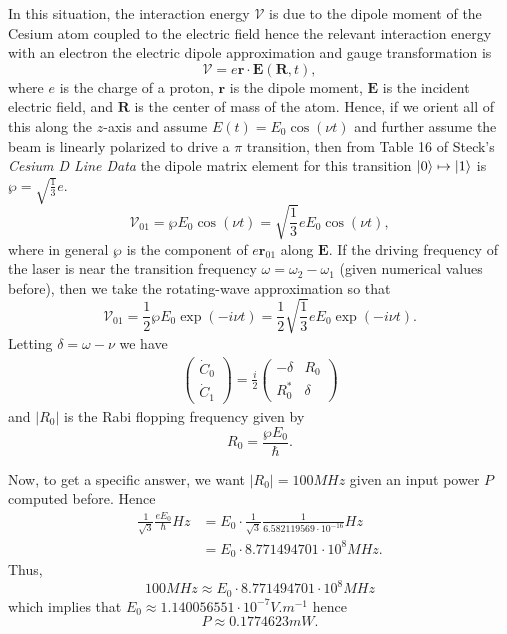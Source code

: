 \documentclass[12pt]{article} %
\begin{document}
\begin{solution}
In this situation, the interaction energy $\mathcal{V}$ is due to the dipole moment of the Cesium atom coupled to the electric field hence the relevant interaction energy with an electron the electric dipole approximation and gauge transformation is
\begin{equation}
\mathcal{V} = e\mathbf{r}\cdot \mathbf{E}(\mathbf{R},t),
\end{equation}
where $e$ is the charge of a proton, $\mathbf{r}$ is the dipole moment, $\mathbf{E}$ is the incident electric field, and  $\mathbf{R}$ is the center of mass of the atom.  Hence, if we orient all of this along the $z$-axis and assume $E(t)=E_0\cos(\nu t)$ and further assume the beam is linearly polarized to drive a $\pi$ transition, then from Table 16 of Steck's \emph{Cesium D Line Data} the dipole matrix element for this transition $\ket{0} \mapsto \ket{1}$ is $\wp = \sqrt{\frac{1}{3}} e$.
\begin{equation}
	\mathcal{V}_{01} = \wp E_0 \cos(\nu t) = \sqrt{\frac{1}{3}}e E_0 \cos(\nu t),
\end{equation}
where in general $\wp$ is the component of $e\mathbf{r}_{01}$ along $\mathbf{E}$. If the driving frequency of the laser is near the transition frequency $\omega = \omega_2-\omega_1$ (given numerical values before), then we take the rotating-wave approximation so that
\begin{equation}
	\mathcal{V}_{01} = \frac{1}{2} \wp E_0 \exp(-i \nu t)= \frac{1}{2}\sqrt{\frac{1}{3}} e E_0 \exp(-i \nu t).
\end{equation}
Letting $\delta = \omega - \nu$ we have
\begin{align}
\begin{pmatrix} 
	\dot{C}_0\\ \dot{C}_1
\end{pmatrix} 
= 
\frac{i}{2} \begin{pmatrix} -\delta & R_0 \\
		R_0^*  & \delta \end{pmatrix}
\end{align}
and $|R_0|$ is the Rabi flopping frequency given by
\begin{equation}
	R_0 = \frac{\wp E_0}{\hbar}.
\end{equation}

Now, to get a specific answer, we want $|R_0| = 100\si{MHz}$ given an input power $P$ computed before. Hence
\begin{align}
	\frac{1}{\sqrt{3}} \frac{e E_0}{\hbar} \si{Hz} &= E_0 \cdot \frac{1}{\sqrt{3}}\frac{1}{6.582119569 \cdot 10^{-16}} \si{Hz}\\
	&= E_0 \cdot 8.771494701 \cdot 10^{8} \si{MHz}.
\end{align}
Thus,
\begin{equation}
100\si{MHz} \approx E_0 \cdot 8.771494701 \cdot 10^{8} \si{MHz}
\end{equation}
which implies that $E_0 \approx 1.140056551 \cdot 10^{-7} \si{V.m^{-1}}$ hence 
\begin{equation}
	 \boxed{P \approx 0.1774623 \si{mW}.}
\end{equation}


\end{solution}
\end{document}
